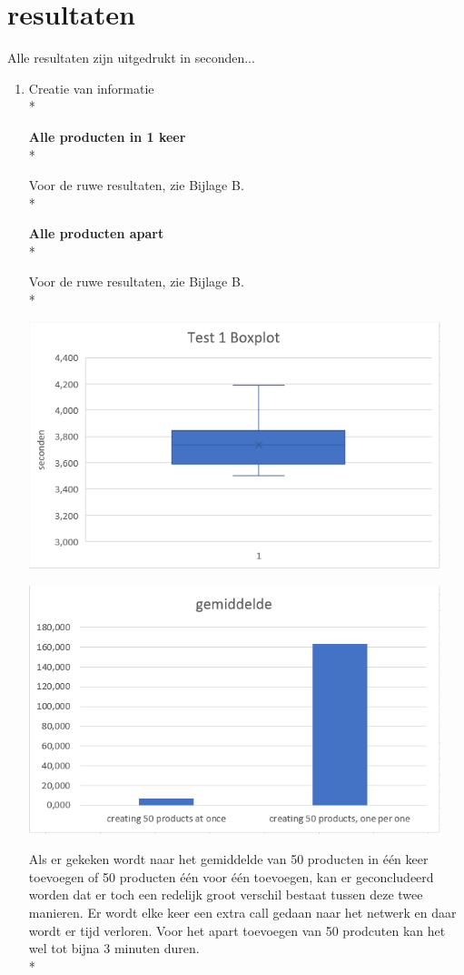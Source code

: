 \documentclass[fleqn,a4paper,12pt]{book}
\begin{document}
\section{resultaten}
Alle resultaten zijn uitgedrukt in seconden...
\begin{enumerate}
	\item Creatie van informatie\\*
	
		\textbf{Alle producten in 1 keer}\\*
		
		 Voor de ruwe resultaten, zie Bijlage B.\\*
		
		\textbf{Alle producten apart}\\*
		
		 Voor de ruwe resultaten, zie Bijlage B.\\*
		
		\begin{center}
			\includegraphics[width=12cm]{img/test-box-1}\\[1cm]
		\end{center}\begin{center}
			\includegraphics[width=12cm]{img/test-column-1}\\[1cm]
		\end{center}
		Als er gekeken wordt naar het gemiddelde van 50 producten in één keer toevoegen of 50 producten één voor één toevoegen, kan er geconcludeerd worden dat er toch een redelijk groot verschil bestaat tussen deze twee manieren. Er wordt elke keer een extra call gedaan naar het netwerk en daar wordt er tijd verloren. Voor het apart toevoegen van 50 prodcuten kan het wel tot bijna 3 minuten duren.\\*
		

\end{enumerate}
\end{document}
